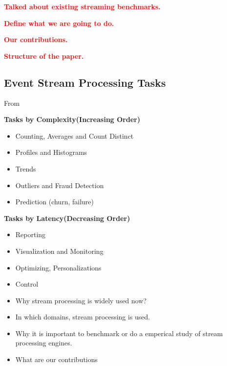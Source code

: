 \documentclass{sig-alternate}
\begin{document}
 \textcolor{Red}{\textbf{Talked about existing streaming benchmarks.}}

 \textcolor{Red}{\textbf{Define what we are going to do.}}

 \textcolor{Red}{\textbf{Our contributions.}}

 \textcolor{Red}{\textbf{Structure of the paper.}}

 \subsection{Event Stream Processing Tasks}


From~\cite{streamdrill:presentation}

 \textbf{Tasks by Complexity(Increasing Order)}

 \begin{itemize}
  \item Counting, Averages and Count Distinct
  \item Profiles and Histograms
  \item Trends
  \item Outliers and Fraud Detection
  \item Prediction (churn, failure)
 \end{itemize}

\textbf{Tasks by Latency(Decreasing Order)}
\begin{itemize}
 \item Reporting
 \item Visualization and Monitoring
 \item Optimizing, Personalizations
 \item Control
\end{itemize}


\begin{itemize}

  \item Why stream processing is widely used now?
  \item In which domains, stream processing is used.
  \item Why it is important to benchmark or do a emperical study of
    stream processing engines.
  \item What are our contributions
\end{itemize}



\end{document}
